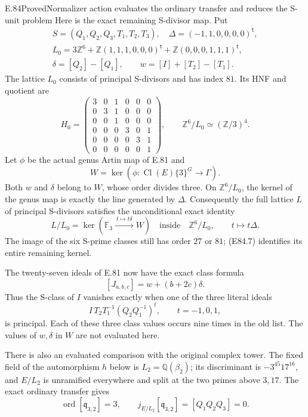 \begin{statement}{E.84}{Proved}{Normalizer action evaluates the ordinary transfer and reduces the S-unit problem}
Here is the exact remaining S-divisor map. Put
\[
 \begin{gathered}
 S=(Q_1,Q_2,Q_3,T_1,T_2,T_3),\quad
 \Delta=(-1,1,0,0,0,0)^{\mathsf t},\\
 L_0=3\mathbb Z^6+
       \mathbb Z(1,1,1,0,0,0)^{\mathsf t}
       +\mathbb Z(0,0,0,1,1,1)^{\mathsf t},\\
 \delta=[Q_2]-[Q_1],\qquad
 w=[I]+[T_2]-[T_1].
 \end{gathered}
 \tag{E84.4}
\]
The lattice \(L_0\) consists of principal S-divisors and has
index \(81\). Its HNF and quotient are
\[
 H_0=
 \begin{pmatrix}
 3&0&1&0&0&0\\0&3&1&0&0&0\\0&0&1&0&0&0\\
 0&0&0&3&0&1\\0&0&0&0&3&1\\0&0&0&0&0&1
 \end{pmatrix},
 \qquad \mathbb Z^6/L_0\simeq(\mathbb Z/3)^4.
 \tag{E84.5}
\]
Let \(\phi\) be the actual genus Artin map of E.81 and
\[
 W=\ker\!\left(\phi:
       \operatorname{Cl}(E)\{3\}^{G}\longrightarrow\Gamma\right).
 \tag{E84.6}
\]
Both \(w\) and \(\delta\) belong to \(W\), whose order divides
three. On \(\mathbb Z^6/L_0\), the kernel of the genus map is
exactly the line generated by \(\Delta\). Consequently the
full lattice \(L\) of principal S-divisors satisfies the
unconditional exact identity
\[
 L/L_0=
 \ker\!\left(\mathbb F_3\xrightarrow{\ t\mapsto t\delta\ }W\right)
 \quad\text{inside}\quad
 \mathbb Z^6/L_0,\qquad t\longmapsto t\Delta .
 \tag{E84.7}
\]
The image of the six S-prime classes still has order \(27\)
or \(81\); (E84.7) identifies its entire remaining kernel.

The twenty-seven ideals of E.81 now have the exact class formula
\[
 [J_{a,b,c}]=w+(b+2c)\delta .
 \tag{E84.8}
\]
Thus the S-class of \(I\) vanishes exactly when one of the three
literal ideals
\[
       I\,T_2T_1^{-1}(Q_2Q_1^{-1})^t,
                    \qquad t=-1,0,1,
 \tag{E84.9}
\]
is principal. Each of these three class values occurs nine
times in the old list. The values of \(w,\delta\) in \(W\)
are not evaluated here.

There is also an evaluated comparison with the original
complex tower. The fixed field of the automorphism \(h\)
below is \(L_2=\mathbb Q(\beta_2)\); its discriminant is
\(-3^{45}17^{16}\), and \(E/L_2\) is unramified everywhere
and split at the two primes above \(3,17\). The exact
ordinary transfer gives
\[
 \operatorname{ord}[\mathfrak q_{3,2}]=3,\qquad
 j_{E/L_2}[\mathfrak q_{3,2}]
       =[Q_1Q_2Q_3]=0.
 \tag{E84.10}
\]


\end{statement}
